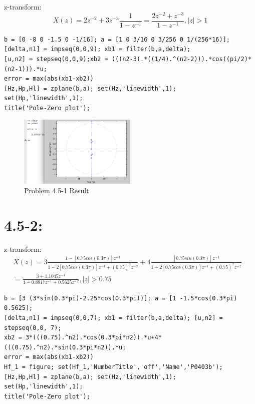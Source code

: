\documentclass[11pt
  , a4paper
  , article
  , oneside
]{memoir}
\begin{document}
z-transform:
\begin {equation}
X(z)= 2z^{-2} + 3z^{-3}\frac{1}{1-z^{-1}} = \frac{2z^{-2}+z^{-3}}{1-z^{-1}}, |z| > 1
\end {equation}


\begin{lstlisting}[style=termstyle]
b = [0 -8 0 -1.5 0 -1/16]; a = [1 0 3/16 0 3/256 0 1/(256*16)];
[delta,n1] = impseq(0,0,9); xb1 = filter(b,a,delta);
[u,n2] = stepseq(0,0,9);xb2 = (((n2-3).*((1/4).^(n2-2))).*cos((pi/2)*(n2-1))).*u;
error = max(abs(xb1-xb2))
[Hz,Hp,Hl] = zplane(b,a); set(Hz,'linewidth',1); set(Hp,'linewidth',1);
title('Pole-Zero plot');
\end{lstlisting}

\begin{figure}[h!]
	\centering
	\includegraphics[width=0.5\textwidth,height=0.25\textwidth]{./images/p405-1.png}
	\caption{Problem 4.5-1 Result}
	\label{fig:Problem 4.5-1 Result}
\end{figure}

\section{4.5-2: }


z-transform:
\begin {equation}
\begin {split}
X(z)= 3\frac{1-[0.75cos(0.3\pi)]z^{-1}}{1-2[0.75cos(0.3\pi)]z^{-1}+(0.75)^2z^{-2}} + 4\frac{[0.75sin(0.3\pi)]z^{-1}}{1-2[0.75cos(0.3\pi)]z^{-1}+(0.75)^2z^{-2}}  &\\
= \frac{3+1.1045z^{-1}}{1-0.8817z^{-1} + 0.5625z^{-2}}, |z| > 0.75
\end{split}
\end {equation}


\begin{lstlisting}[style=termstyle]
b = [3 (3*sin(0.3*pi)-2.25*cos(0.3*pi))]; a = [1 -1.5*cos(0.3*pi) 0.5625];
[delta,n1] = impseq(0,0,7); xb1 = filter(b,a,delta); [u,n2] = stepseq(0,0, 7);
xb2 = 3*(((0.75).^n2).*cos(0.3*pi*n2)).*u+4*(((0.75).^n2).*sin(0.3*pi*n2)).*u;
error = max(abs(xb1-xb2))
Hf_1 = figure; set(Hf_1,'NumberTitle','off','Name','P0403b');
[Hz,Hp,Hl] = zplane(b,a); set(Hz,'linewidth',1); set(Hp,'linewidth',1);
title('Pole-Zero plot');
\end{lstlisting}
\end{document}
